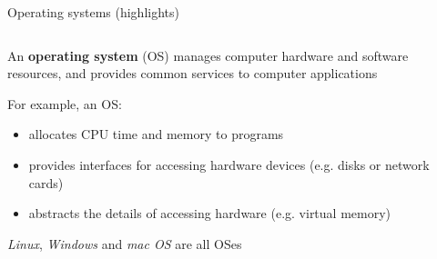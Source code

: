 \begin{frame}{Operating systems (highlights)}

  \begin{columns}

    \begin{column}{.69\textwidth}

    An \textbf{operating system} (OS) manages computer hardware and software
    resources, and provides common services to computer applications

    \vspace{2mm}

    For example, an OS:
    \begin{itemize}
      \item allocates CPU time and memory to programs
      \item provides interfaces for accessing hardware devices (e.g. disks or
            network cards)
      \item abstracts the details of accessing hardware (e.g. virtual memory)
    \end{itemize}

    \vspace{2mm}

    \textit{Linux}, \textit{Windows} and \textit{mac OS} are all OSes

  \end{column}


\end{columns}
\end{frame}

